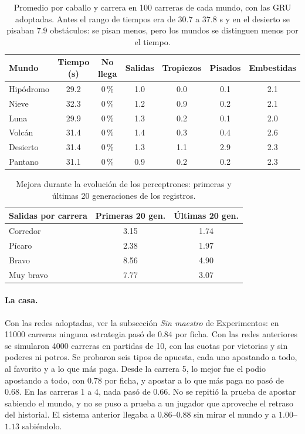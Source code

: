 \documentclass[11pt,letterpaper]{article}
\begin{document}
\begin{table}[h]
\centering
\begin{tabular}{lcccccc}
\toprule
Mundo & Tiempo (s) & No llega & Salidas & Tropiezos & Pisados & Embestidas \\
\midrule
Hipódromo & 29.2 & 0\,\% & 1.0 & 0.0 & 0.1 & 2.1 \\
Nieve & 32.3 & 0\,\% & 1.2 & 0.9 & 0.2 & 2.1 \\
Luna & 29.9 & 0\,\% & 1.3 & 0.2 & 0.1 & 2.0 \\
Volcán & 31.4 & 0\,\% & 1.4 & 0.3 & 0.4 & 2.6 \\
Desierto & 31.4 & 0\,\% & 1.3 & 1.1 & 2.9 & 2.3 \\
Pantano & 31.1 & 0\,\% & 0.9 & 0.2 & 0.2 & 2.3 \\
\bottomrule
\end{tabular}
\caption{Promedio por caballo y carrera en 100 carreras de cada mundo, con las GRU adoptadas. Antes el rango de tiempos era de $30.7$ a $37.8$ s y en el desierto se pisaban $7.9$ obstáculos: se pisan menos, pero los mundos se distinguen menos por el tiempo.}
\end{table}

\begin{table}[h]
\centering
\begin{tabular}{lcc}
\toprule
Salidas por carrera & Primeras 20 gen. & Últimas 20 gen. \\
\midrule
Corredor & 3.15 & 1.74 \\
Pícaro & 2.38 & 1.97 \\
Bravo & 8.56 & 4.90 \\
Muy bravo & 7.77 & 3.07 \\
\bottomrule
\end{tabular}
\caption{Mejora durante la evolución de los perceptrones: primeras y últimas 20 generaciones de los registros.}
\end{table}

\paragraph{La casa.} Con las redes adoptadas, ver la subsección \emph{Sin maestro} de Experimentos: en 11000 carreras ninguna estrategia pasó de $0.84$ por ficha. Con las redes anteriores se simularon 4000 carreras en partidas de 10, con las cuotas por victorias y sin poderes ni potros. Se probaron seis tipos de apuesta, cada uno apostando a todo, al favorito y a lo que más paga. Desde la carrera 5, lo mejor fue el podio apostando a todo, con $0.78$ por ficha, y apostar a lo que más paga no pasó de $0.68$. En las carreras 1 a 4, nada pasó de $0.66$. No se repitió la prueba de apostar sabiendo el mundo, y no se puso a prueba a un jugador que aproveche el retraso del historial. El sistema anterior llegaba a $0.86$--$0.88$ sin mirar el mundo y a $1.00$--$1.13$ sabiéndolo.
\end{document}
